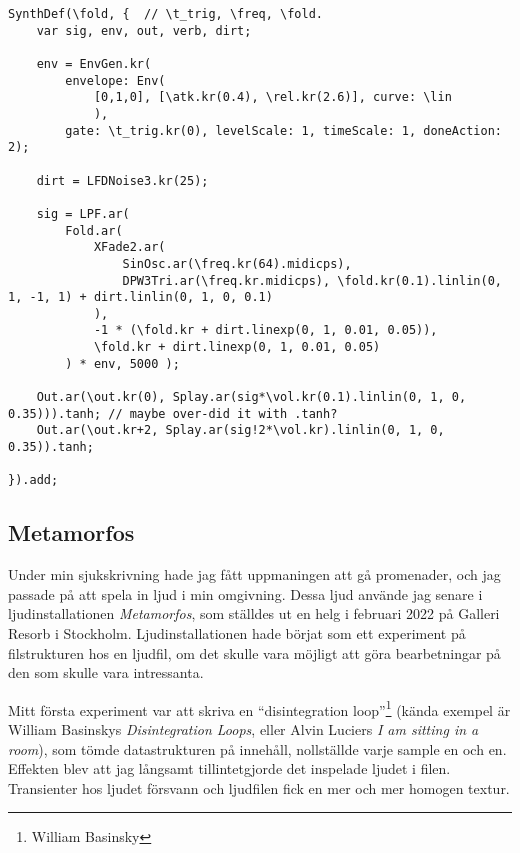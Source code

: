 \documentclass{article}
\renewcommand{\baselinestretch}{1.5}
\begin{document}
\renewcommand{\baselinestretch}{1}
\begin{lstlisting}[style=SuperCollider-IDE, caption=Fold-synt]
SynthDef(\fold, {  // \t_trig, \freq, \fold.
	var sig, env, out, verb, dirt;

	env = EnvGen.kr(
		envelope: Env(
			[0,1,0], [\atk.kr(0.4), \rel.kr(2.6)], curve: \lin
			), 
		gate: \t_trig.kr(0), levelScale: 1, timeScale: 1, doneAction: 2);

	dirt = LFDNoise3.kr(25);

	sig = LPF.ar( 
		Fold.ar(
			XFade2.ar(
				SinOsc.ar(\freq.kr(64).midicps), 
				DPW3Tri.ar(\freq.kr.midicps), \fold.kr(0.1).linlin(0, 1, -1, 1) + dirt.linlin(0, 1, 0, 0.1)
			),
			-1 * (\fold.kr + dirt.linexp(0, 1, 0.01, 0.05)),
			\fold.kr + dirt.linexp(0, 1, 0.01, 0.05)
		) * env, 5000 );

	Out.ar(\out.kr(0), Splay.ar(sig*\vol.kr(0.1).linlin(0, 1, 0, 0.35))).tanh; // maybe over-did it with .tanh?
	Out.ar(\out.kr+2, Splay.ar(sig!2*\vol.kr).linlin(0, 1, 0, 0.35)).tanh;

}).add;
\end{lstlisting}
\renewcommand{\baselinestretch}{1.5}

  \subsection{Metamorfos}
  Under min sjukskrivning hade jag fått uppmaningen att gå promenader, och jag passade på att spela in ljud i
  min omgivning. Dessa ljud använde jag senare i ljudinstallationen \emph{Metamorfos}, som ställdes ut en helg i
  februari 2022 på Galleri Resorb i Stockholm. Ljudinstallationen hade börjat som ett experiment på
  filstrukturen hos en ljudfil, om det skulle vara möjligt att göra bearbetningar på den som skulle vara
  intressanta. 

  Mitt första experiment var att skriva en ``disintegration loop''\footnote{William Basinsky} (kända
  exempel är William Basinskys \emph{Disintegration Loops}, eller Alvin Luciers \emph{I am sitting in a room}), som
  tömde datastrukturen på innehåll, nollställde varje sample en och en. Effekten blev att jag långsamt
  tillintetgjorde det inspelade ljudet i filen. Transienter hos ljudet försvann och ljudfilen fick en mer och
  mer homogen textur.
\end{document}
